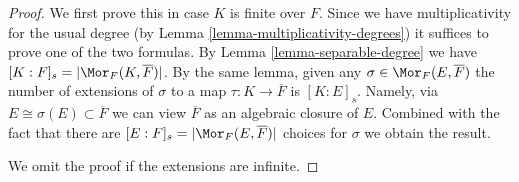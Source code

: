 \begin{proof}
We first prove this in case $K$ is finite over $F$. Since we have
multiplicativity for the usual degree (by
Lemma \ref{lemma-multiplicativity-degrees}) it suffices to prove
one of the two formulas. By Lemma \ref{lemma-separable-degree} we have
$[K : F]_s = |\Mor_F(K, \overline{F})|$. By the same lemma,
given any $\sigma \in \Mor_F(E, \overline{F})$ the number of extensions
of $\sigma$ to a map $\tau : K \to \overline{F}$ is $[K : E]_s$.
Namely, via $E \cong \sigma(E) \subset \overline{F}$ we can view
$\overline{F}$ as an algebraic closure of $E$. Combined with the
fact that there are $[E : F]_s = |\Mor_F(E, \overline{F})|$ choices
for $\sigma$ we obtain the result.

\medskip\noindent
We omit the proof if the extensions are infinite.
\end{proof}









